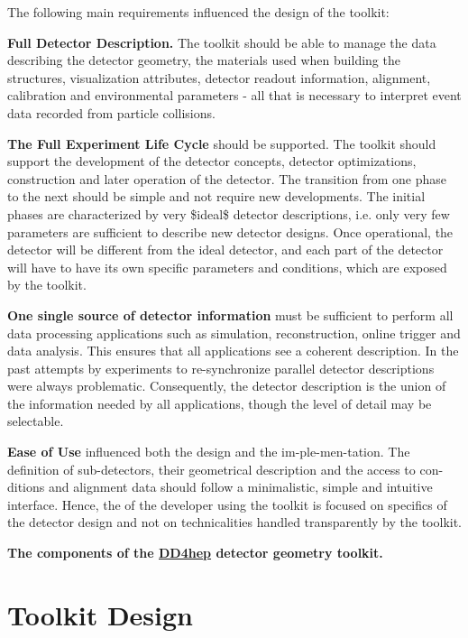 The following main requirements influenced the design of the toolkit\+:


\begin{DoxyItemize}
\item {\bfseries Full Detector Description.} The toolkit should be able to manage the data describing the detector geometry, the materials used when building the structures, visualization attributes, detector readout information, alignment, calibration and environmental parameters -\/ all that is necessary to interpret event data recorded from particle collisions.
\item {\bfseries The Full Experiment Life Cycle} should be supported. The toolkit should support the development of the detector concepts, detector optimizations, construction and later operation of the detector. The transition from one phase to the next should be simple and not require new developments. The initial phases are characterized by very \$ideal\$ detector descriptions, i.\+e. only very few parameters are sufficient to describe new detector designs. Once operational, the detector will be different from the ideal detector, and each part of the detector will have to have its own specific parameters and conditions, which are exposed by the toolkit.
\item {\bfseries One single source of detector information} must be sufficient to perform all data processing applications such as simulation, reconstruction, online trigger and data analysis. This ensures that all applications see a coherent description. In the past attempts by experiments to re-\/synchronize parallel detector descriptions were always problematic. Consequently, the detector description is the union of the information needed by all applications, though the level of detail may be selectable.
\item {\bfseries Ease of Use} influenced both the design and the im-\/ple-\/men-\/tation. The definition of sub-\/detectors, their geometrical description and the access to con-\/ditions and alignment data should follow a minimalistic, simple and intuitive interface. Hence, the of the developer using the toolkit is focused on specifics of the detector design and not on technicalities handled transparently by the toolkit.
\end{DoxyItemize} {\bfseries The components of the \hyperlink{namespace_d_d4hep}{D\+D4hep} detector geometry toolkit.}\hypertarget{index_DESIGN}{}\section{Toolkit Design}\label{index_DESIGN}
